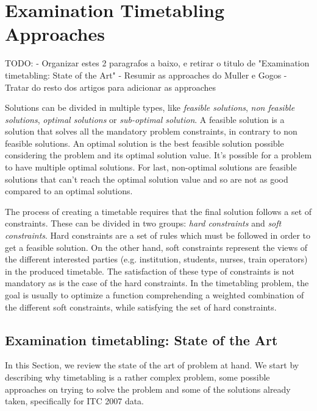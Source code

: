 \chapter{Examination Timetabling Approaches}
\label{theory}
\thispagestyle{plain}


TODO: 
- Organizar estes 2 paragrafos a baixo, e retirar o titulo de "Examination timetabling: State of the Art"
- Resumir as approaches do Muller e Gogos
- Tratar do resto dos artigos para adicionar as approaches

Solutions can be divided in multiple types, like \textit{feasible solutions}, \textit{non feasible solutions}, \textit{optimal solutions} or \textit{sub-optimal solution}. A feasible solution is a solution that solves all the mandatory problem constraints, in contrary to non feasible solutions. An optimal solution is the best feasible solution possible considering the problem and its optimal solution value. It's possible for a problem to have multiple optimal solutions. For last, non-optimal solutions are feasible solutions that can't reach the optimal solution value and so are not as good compared to an optimal solutions.

The process of creating a timetable requires that the final solution follows a set of constraints. These can be divided in two groups: \textit{hard constraints} and \textit{soft constraints}. Hard constraints are a set of rules which must be followed in order to get a feasible solution. On the other hand, soft constraints represent the views of the different interested parties (e.g. institution, students, nurses, train operators) in the produced timetable. The satisfaction of these type of constraints is not mandatory as is the case of the hard constraints. In the timetabling problem, the goal is usually to optimize a function comprehending a weighted combination of the different soft constraints, while satisfying the set of hard constraints. 



\section{Examination timetabling: State of the Art}
\label{sec:sota}
In this Section, we review the state of the art of problem at hand. We start by describing why timetabling is a rather complex problem, some possible approaches on trying to solve the problem and some of the solutions already taken, specifically for ITC 2007 data.
\\
